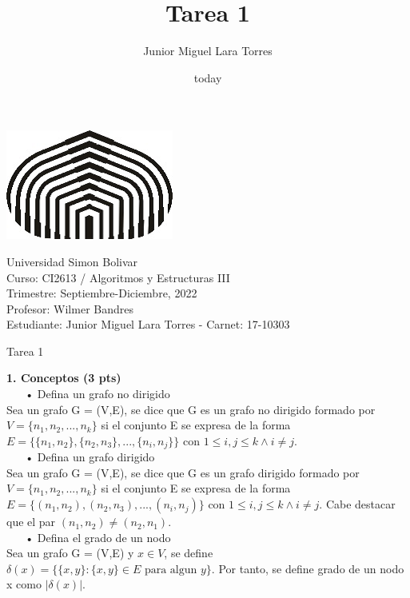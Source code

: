 \documentclass[a4paper,12pt]{article}
\title{Tarea 1}
\author{Junior Miguel Lara Torres}
\date{today}
\begin{document}
\begin{center}
\par \includegraphics[scale=1]{USB} \par
Universidad Simon Bolivar \\ Curso: CI2613 / Algoritmos y Estructuras III \\ Trimestre: Septiembre-Diciembre, 2022 \\ Profesor: Wilmer Bandres \\ Estudiante: Junior Miguel Lara Torres - Carnet: 17-10303 \\
\end{center}

\begin{center}
Tarea 1
\end{center}

\textbf{1. Conceptos (3 pts)} \\

$ ~~~~~~ $ • Defina un grafo no dirigido \\

Sea un grafo G = (V,E), se dice que G es un grafo no dirigido formado por $V = \{n_1, n_2, ..., n_k\}$ si el conjunto E se expresa de la forma $E = \{ \{n_1,n_2\}, \{n_2,n_3\}, ..., \{n_i,n_j\} \}$ con $1\leq i, j\leq k \land i \neq j$. \\

$ ~~~~~~ $ • Defina un grafo dirigido \\

Sea un grafo G = (V,E), se dice que G es un grafo dirigido formado por $V = \{n_1, n_2, ..., n_k\}$ si el conjunto E se expresa de la forma $E = \{ (n_1,n_2), (n_2,n_3), ..., (n_i,n_j) \}$ con $1\leq i, j\leq k \land i \neq j$. Cabe destacar que el par $(n_1,n_2) \neq (n_2,n_1)$. \\

$ ~~~~~~ $ • Defina el grado de un nodo \\

Sea un grafo G = (V,E) y $x \in V$, se define $\delta(x) = \{\{x,y\} : \{x,y\} \in E \text{ para algun } y\} $. Por tanto, se define grado de un nodo x como $|\delta(x)|$. \\
\end{document}
